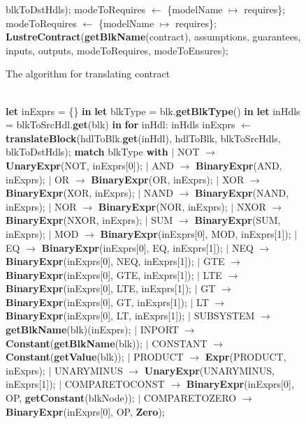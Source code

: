\documentclass{article}
\begin{document}
\begin{figure}
\begin{algorithmic}
\State {\ \ \ \ \ \ \ \ \ \ \ \ \ \ \ \ \ \ \ \ \ \ \ \ \ \ \ \ \ \ \ \ \ \ \ \ \ \ \ \ \ \ \ \ \ \ \ \ \ \ \ \ \ \ \ \ \ \ \ \ \ \ \ \ \ \ \ \ \ \ \ \ \ \ \ \ \ \ \ \ \ \ \ \ \ \ \ \ } blkToDstHdls);
\State {\ \ \ \ \ \ \ \ \ \ \ \ \ \ \ \ \ \ \ \ \ \ } modeToRequires $\leftarrow$ \{modelName $\mapsto$ requires\};
\State {\ \ \ \ \ \ \ \ \ \ \ \ \ \ \ \ \ \ \ \ \ \ } modeToRequires $\leftarrow$ \{modelName $\mapsto$ requires\};
\State \textbf{LustreContract}(\textbf{getBlkName}(contract), assumptions, guarantees, inputs, outputs, 
\State {\ \ \ \ \ \ \ \ \ \ \ \ \ \ \ \ \ \ \ \ \ \ \ \ } modeToRequires, modeToEnsures);
\EndFunction
\end{algorithmic}
\label{contract}
\caption{The algorithm for translating contract }
\end{figure}

\begin{figure}
\begin{algorithmic}
\\
\State \textbf{let} inExprs = \{\} \textbf{in}
\State \textbf{let} blkType = blk.\textbf{getBlkType}() \textbf{in}
\State \textbf{let} inHdls = blkToSrcHdl.\textbf{get}(blk) \textbf{in}
\State \textbf{for} inHdl: inHdls
\State {\ \ \ \ } inExprs $\leftarrow$ \textbf{translateBlock}(hdlToBlk.\textbf{get}(inHdl), hdlToBlk, blkToSrcHdls, blkToDstHdls);
\State \textbf{match} blkType \textbf{with}
\State $\mid$ NOT $\rightarrow$ \textbf{UnaryExpr}(NOT, inExprs[0]);
\State $\mid$ AND $\rightarrow$ \textbf{BinaryExpr}(AND, inExprs);
\State $\mid$ OR $\rightarrow$ \textbf{BinaryExpr}(OR, inExprs);
\State $\mid$ XOR $\rightarrow$ \textbf{BinaryExpr}(XOR, inExprs);
\State $\mid$ NAND $\rightarrow$ \textbf{BinaryExpr}(NAND, inExprs);
\State $\mid$ NOR $\rightarrow$ \textbf{BinaryExpr}(NOR, inExprs);
\State $\mid$ NXOR $\rightarrow$ \textbf{BinaryExpr}(NXOR, inExprs);
\State $\mid$ SUM $\rightarrow$ \textbf{BinaryExpr}(SUM, inExprs);
\State $\mid$ MOD $\rightarrow$ \textbf{BinaryExpr}(inExprs[0], MOD, inExprs[1]);
\State $\mid$ EQ $\rightarrow$ \textbf{BinaryExpr}(inExprs[0], EQ, inExprs[1]);
\State $\mid$ NEQ $\rightarrow$ \textbf{BinaryExpr}(inExprs[0], NEQ, inExprs[1]);
\State $\mid$ GTE $\rightarrow$ \textbf{BinaryExpr}(inExprs[0], GTE, inExprs[1]);
\State $\mid$ LTE $\rightarrow$ \textbf{BinaryExpr}(inExprs[0], LTE, inExprs[1]);
\State $\mid$ GT $\rightarrow$ \textbf{BinaryExpr}(inExprs[0], GT, inExprs[1]);
\State $\mid$ LT $\rightarrow$ \textbf{BinaryExpr}(inExprs[0], LT, inExprs[1]);
\State $\mid$ SUBSYSTEM $\rightarrow$ \textbf{getBlkName}(blk)(inExprs);
\State $\mid$ INPORT $\rightarrow$ \textbf{Constant}(\textbf{getBlkName}(blk));
\State $\mid$ CONSTANT $\rightarrow$ \textbf{Constant}(\textbf{getValue}(blk));
\State $\mid$ PRODUCT $\rightarrow$ \textbf{Expr}(PRODUCT, inExprs);
\State $\mid$ UNARYMINUS $\rightarrow$ \textbf{UnaryExpr}(UNARYMINUS, inExprs[1]);
\State $\mid$ COMPARETOCONST $\rightarrow$ \textbf{BinaryExpr}(inExprs[0], OP, \textbf{getConstant}(blkNode));
\State $\mid$ COMPARETOZERO $\rightarrow$ \textbf{BinaryExpr}(inExprs[0], OP, \textbf{Zero});


\end{algorithmic}
\end{figure}
\end{document}
